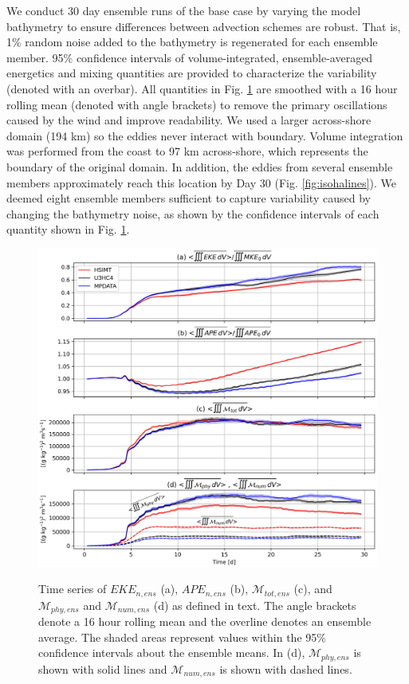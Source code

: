 We conduct 30 day ensemble runs of the base case by varying the model bathymetry to ensure differences between advection schemes are robust. That is, 1\% random noise added to the bathymetry is regenerated for each ensemble member. 95\% confidence intervals of volume-integrated, ensemble-averaged energetics and mixing quantities are provided to characterize the variability (denoted with an overbar). All quantities in Fig. \ref{fig:tadv_vol_int} are smoothed with a 16 hour rolling mean (denoted with angle brackets) to remove the primary oscillations caused by the wind and improve readability. We used a larger across-shore domain (194 km) so the eddies never interact with boundary. Volume integration was performed from the coast to 97 km across-shore, which represents the boundary of the original domain. In addition, the eddies from several ensemble members approximately reach this location by Day 30 (Fig. \ref{fig:isohalines}). We deemed eight ensemble members sufficient to capture variability caused by changing the bathymetry noise, as shown by the confidence intervals of each quantity shown in Fig. \ref{fig:tadv_vol_int}. 

\begin{figure}[t!]
    \begin{center} 
    \includegraphics[width = 0.9\linewidth]{figures/shelfstrat_2024/tadvection_vol_int_ens.jpg}\\
    \caption{Time series of $EKE_{n,ens}$ (a), $APE_{n,ens}$ (b), $\mathcal{M}_{tot, ens}$ (c), and $\mathcal{M}_{phy,ens}$ and $\mathcal{M}_{num,ens}$ (d) as defined in text. The angle brackets denote a 16 hour rolling mean and the overline denotes an ensemble average. The shaded areas represent values within the 95\% confidence intervals about the ensemble means. In (d), $\mathcal{M}_{phy,ens}$ is shown with solid lines and $\mathcal{M}_{num,ens}$ is shown with dashed lines.} \label{fig:tadv_vol_int}
     \end{center} 
\end{figure}

